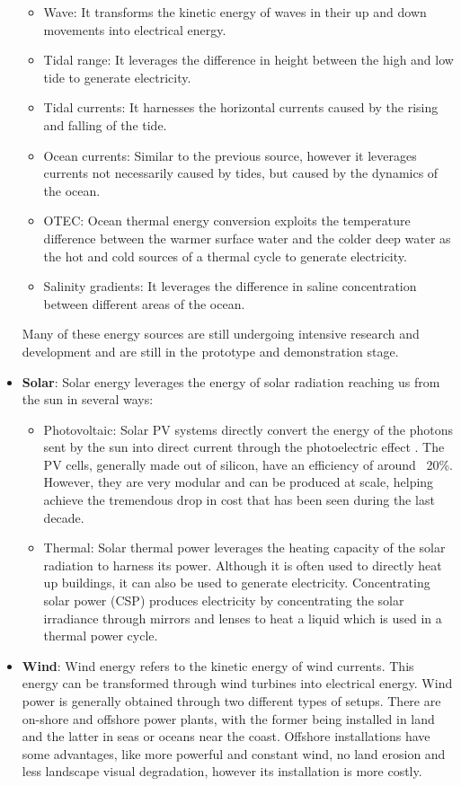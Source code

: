 \begin{itemize}
    \begin{itemize}
        \item Wave: It transforms the kinetic energy of waves in their up and down movements into electrical energy.
        \item Tidal range: It leverages the difference in height between the high and low tide to generate electricity. 
        \item Tidal currents: It harnesses the horizontal currents caused by the rising and falling of the tide.
        \item Ocean currents: Similar to the previous source, however it leverages currents not necessarily caused by tides, but caused by the dynamics of the ocean.
        \item OTEC: Ocean thermal energy conversion exploits the temperature difference between the warmer surface water and the colder deep water as the hot and cold sources of a thermal cycle to generate electricity.
        \item Salinity gradients: It leverages the difference in saline concentration between different areas of the ocean.
    \end{itemize}
    Many of these energy sources are still undergoing intensive research and development and are still in the prototype and demonstration stage.
    \item \textbf{Solar}: Solar energy leverages the energy of solar radiation reaching us from the sun in several ways:
    \begin{itemize}
        \item Photovoltaic: Solar PV systems directly convert the energy of the photons sent by the sun into direct current through the photoelectric effect \cite{einstein_1905}. The PV cells, generally made out of silicon, have an efficiency of around ~20\%. However, they are very modular and can be produced at scale, helping achieve the tremendous drop in cost that has been seen during the last decade. 
        \item Thermal: Solar thermal power leverages the heating capacity of the solar radiation to harness its power. Although it is often used to directly heat up buildings, it can also be used to generate electricity. Concentrating solar power (CSP) produces electricity by concentrating the solar irradiance through mirrors and lenses to heat a liquid which is used in a thermal power cycle. 
    \end{itemize}
    \item \textbf{Wind}: Wind energy refers to the kinetic energy of wind currents. This energy can be transformed through wind turbines into electrical energy. Wind power is generally obtained through two different types of setups. There are on-shore and offshore power plants, with the former being installed in land and the latter in seas or oceans near the coast. Offshore installations have some advantages, like more powerful and constant wind, no land erosion and less landscape visual degradation, however its installation is more costly. 
\end{itemize}


